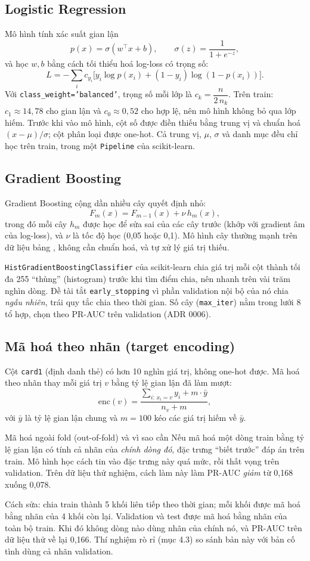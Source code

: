 \documentclass[11pt,a4paper]{article}
\newcommand{\code}[1]{\texttt{\small #1}}
\begin{document}
\subsection{Logistic Regression}
Mô hình tính xác suất gian lận
\[
p(x)=\sigma(w^\top x+b),\qquad \sigma(z)=\frac{1}{1+e^{-z}},
\]
và học $w,b$ bằng cách tối thiểu hoá log-loss có trọng số:
\[
L=-\sum_i c_{y_i}\bigl[y_i\log p(x_i)+(1-y_i)\log(1-p(x_i))\bigr].
\]
Với \code{class\_weight='balanced'}, trọng số mỗi lớp là $c_k=\dfrac{n}{2\,n_k}$. Trên train: $c_1\approx 14{,}78$ cho gian lận và $c_0\approx 0{,}52$ cho hợp lệ, nên mô hình không bỏ qua lớp hiếm. Trước khi vào mô hình, cột số được điền thiếu bằng trung vị và chuẩn hoá $(x-\mu)/\sigma$; cột phân loại được one-hot. Cả trung vị, $\mu$, $\sigma$ và danh mục đều chỉ học trên train, trong một \code{Pipeline} của scikit-learn.

\subsection{Gradient Boosting}
Gradient Boosting cộng dần nhiều cây quyết định nhỏ:
\[
F_m(x)=F_{m-1}(x)+\nu\,h_m(x),
\]
trong đó mỗi cây $h_m$ được học để sửa sai của các cây trước (khớp với gradient âm của log-loss), và $\nu$ là tốc độ học (0,05 hoặc 0,1). Mô hình cây thường mạnh trên dữ liệu bảng \cite{grinsztajn}, không cần chuẩn hoá, và tự xử lý giá trị thiếu.

\code{HistGradientBoostingClassifier} của scikit-learn chia giá trị mỗi cột thành tối đa 255 ``thùng'' (histogram) trước khi tìm điểm chia, nên nhanh trên vài trăm nghìn dòng. Đề tài tắt \code{early\_stopping} vì phần validation nội bộ của nó chia \emph{ngẫu nhiên}, trái quy tắc chia theo thời gian. Số cây (\code{max\_iter}) nằm trong lưới 8 tổ hợp, chọn theo PR-AUC trên validation (ADR 0006).

\subsection{Mã hoá theo nhãn (target encoding)}
Cột \code{card1} (định danh thẻ) có hơn 10 nghìn giá trị, không one-hot được. Mã hoá theo nhãn thay mỗi giá trị $v$ bằng tỷ lệ gian lận đã làm mượt:
\[
\text{enc}(v)=\frac{\sum_{i:\,x_i=v}y_i+m\cdot\bar{y}}{n_v+m},
\]
với $\bar y$ là tỷ lệ gian lận chung và $m=100$ kéo các giá trị hiếm về $\bar y$.

\begin{explain}{Mã hoá ngoài fold (out-of-fold) và vì sao cần}
Nếu mã hoá một dòng train bằng tỷ lệ gian lận có tính cả nhãn của \emph{chính dòng đó}, đặc trưng ``biết trước'' đáp án trên train. Mô hình học cách tin vào đặc trưng này quá mức, rồi thất vọng trên validation. Trên dữ liệu thử nghiệm, cách làm này làm PR-AUC \emph{giảm} từ 0,168 xuống 0,078.

Cách sửa: chia train thành 5 khối liên tiếp theo thời gian; mỗi khối được mã hoá bằng nhãn của 4 khối còn lại. Validation và test được mã hoá bằng nhãn của toàn bộ train. Khi đó không dòng nào dùng nhãn của chính nó, và PR-AUC trên dữ liệu thử về lại 0,166. Thí nghiệm rò rỉ (mục 4.3) so sánh bản này với bản cố tình dùng cả nhãn validation.
\end{explain}
\end{document}
